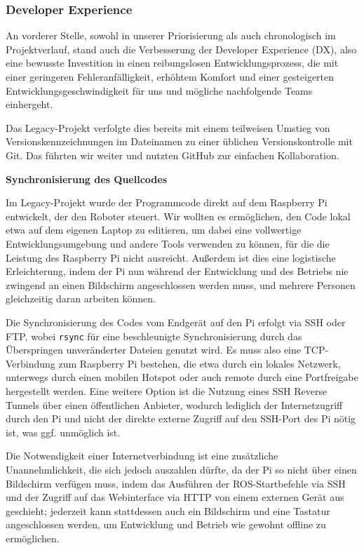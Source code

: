 \subsubsection{Developer Experience}

An vorderer Stelle, sowohl in unserer Priorisierung als auch chronologisch im Projektverlauf, stand auch die Verbesserung der Developer Experience (DX), also eine bewusste Investition in einen reibungslosen Entwicklungsprozess, die mit einer geringeren Fehleranfälligkeit, erhöhtem Komfort und einer gesteigerten Entwicklungsgeschwindigkeit für uns und mögliche nachfolgende Teams einhergeht. 

Das Legacy-Projekt verfolgte dies bereits mit einem teilweisen Umstieg von Versionskennzeichnungen im Dateinamen zu einer üblichen Versionskontrolle mit Git. Das führten wir weiter und nutzten GitHub zur einfachen Kollaboration. 

\textbf{Synchronisierung des Quellcodes}

Im Legacy-Projekt wurde der Programmcode direkt auf dem Raspberry Pi entwickelt, der den Roboter steuert. Wir wollten es ermöglichen, den Code lokal etwa auf dem eigenen Laptop zu editieren, um dabei eine vollwertige Entwicklungsumgebung und andere Tools verwenden zu können, für die die Leistung des Raspberry Pi nicht ausreicht. Außerdem ist dies eine logistische Erleichterung, indem der Pi nun während der Entwicklung und des Betriebs nie zwingend an einen Bildschirm angeschlossen werden muss, und mehrere Personen gleichzeitig daran arbeiten können. 

Die Synchronisierung des Codes vom Endgerät auf den Pi erfolgt via SSH oder FTP, wobei \texttt{rsync} für eine beschleunigte Synchronisierung durch das Überspringen unveränderter Dateien genutzt wird. Es muss also eine TCP-Verbindung zum Raspberry Pi bestehen, die etwa durch ein lokales Netzwerk, unterwegs durch einen mobilen Hotspot oder auch remote durch eine Portfreigabe hergestellt werden. Eine weitere Option ist die Nutzung eines SSH Reverse Tunnels über einen öffentlichen Anbieter, wodurch lediglich der Internetzugriff durch den Pi und nicht der direkte externe Zugriff auf den SSH-Port des Pi nötig ist, was ggf. unmöglich ist. 

Die Notwendigkeit einer Internetverbindung ist eine zusätzliche Unannehmlichkeit, die sich jedoch auszahlen dürfte, da der Pi so nicht über einen Bildschirm verfügen muss, indem das Ausführen der ROS-Startbefehle via SSH und der Zugriff auf das Webinterface via HTTP von einem externen Gerät aus geschieht; jederzeit kann stattdessen auch ein Bildschirm und eine Tastatur angeschlossen werden, um Entwicklung und Betrieb wie gewohnt offline zu ermöglichen. 

